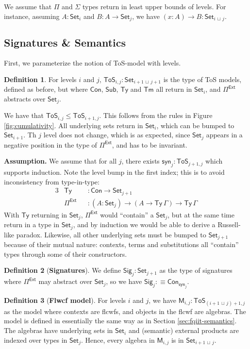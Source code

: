 \documentclass[12pt,a4paper,twoside,openany]{book}
\theoremstyle{remark}
\theoremstyle{definition}
\newtheorem{mydefinition}{Definition}
\theoremstyle{theorem}
\newcommand{\bs}[1]{\boldsymbol{#1}}
\newcommand{\Con}{\mathsf{Con}}
\newcommand{\Sub}{\mathsf{Sub}}
\newcommand{\Tm}{\mathsf{Tm}}
\newcommand{\Ty}{\mathsf{Ty}}
\newcommand{\Set}{\mathsf{Set}}
\newcommand{\ToS}{\mathsf{ToS}}
\newcommand{\Pie}{\Pi^{\mathsf{Ext}}}
\newcommand{\Sig}{\mathsf{Sig}}
\newcommand{\syn}{\mathsf{syn}}
\newcommand{\bM}{\bs{\mathsf{M}}}
\newcommand{\defn}{:\equiv}
\newcommand{\lub}{\,\sqcup\,}
\begin{document}
We assume that $\Pi$ and $\Sigma$ types return in least upper bounds of levels. For instance,
assuming $A : \Set_i$ and $B : A \to \Set_j$, we have $(x : A) \to B : \Set_{i \lub j}$.

\subsection{Signatures \& Semantics}
\label{sec:ett-signatures}

First, we parameterize the notion of ToS-model with levels.
\begin{mydefinition}
\label{def:ftos-models}
For levels $i$ and $j$, $\ToS_{i,j} : \Set_{i+1\lub j+1}$ is the type of ToS
models, defined as before, but where $\Con$, $\Sub$, $\Ty$ and $\Tm$ all return
in $\Set_i$, and $\Pie$ abstracts over $\Set_j$.
\end{mydefinition}

We have that $\ToS_{i,j} \leq \ToS_{i+1,j}$. This follows from the rules
in Figure \ref{fig:cumulativity}. All underlying sets return in $\Set_i$, which
can be bumped to $\Set_{i + 1}$.  Th $j$ level does not change, which is as
expected, since $\Set_j$ appears in a negative position in the type of $\Pie$,
and has to be invariant.

\textbf{Assumption.}
We assume that for all $j$, there exists $\syn_j : \ToS_{j+1,j}$ which supports
induction. Note the level bump in the first index; this is to avoid
inconsistency from type-in-type:
\begin{alignat*}{3}
  &\Ty &&: \Con \to \Set_{j+1}\\ &\Pie &&: (A : \Set_j) \to (A \to \Ty\,\Gamma)
  \to \Ty\,\Gamma
\end{alignat*}
With $\Ty$ returning in $\Set_j$, $\Pie$ would ``contain'' a $\Set_j$, but at
the same time return in a type in $\Set_j$, and by induction we would be able to
derive a Russell-like paradox. Likewise, all other underlying sets
must be bumped to $\Set_{j+1}$ because of their mutual nature: contexts, terms
and substitutions all ``contain'' types through some of their constructors.

\begin{mydefinition}[\textbf{Signatures}]
We define $\Sig_j : \Set_{j+1}$ as the type of signatures where $\Pie$ may
abstract over $\Set_j$, so we have $\Sig_j \defn \Con_{\syn_j}$.
\end{mydefinition}

\begin{mydefinition}[\textbf{Flwcf model}]
For levels $i$ and $j$, we have $\bM_{i,j} : \ToS_{(i+1\lub j)+1,j}$ as the
model where contexts are flcwfs, and objects in the flcwf are algebras.  The
model is defined in essentially the same way as in Section
\ref{sec:fqiit-semantics}. The algebras have underlying sets in $\Set_i$ and
(semantic) external products are indexed over types in $\Set_j$. Hence, every
algebra in $\bM_{i,j}$ is in $\Set_{i+1\lub j}$.
\end{mydefinition}
\end{document}
